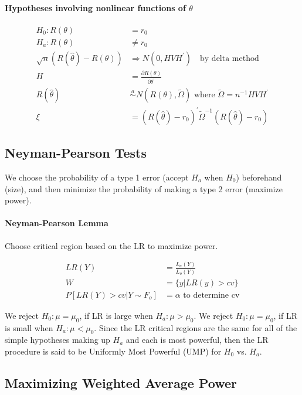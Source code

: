 \paragraph{Hypotheses involving nonlinear functions of $\theta$}

\begin{align*}
    H_0: R(\theta) &= r_0 \\
    H_a: R(\theta) &\neq r_0 \\
    \sqrt{n}(R(\hat{\theta})-R(\theta)) &\Rightarrow N \left(0, H V H^{\prime}\right) \quad \text{by delta method}\\
    H&=\frac{\partial R(\theta)}{\partial \theta^{\prime}} \\
    R(\hat{\theta}) &\stackrel{a}{\sim} N (R(\theta), \tilde{\Omega}) \text{ where } \tilde{\Omega}=n^{-1} H V H^{\prime} \\
    \xi&=\left(R(\hat{\theta})-r_0\right)^{\prime} \tilde{\Omega}^{-1}\left(R(\hat{\theta})-r_0\right)
\end{align*}

\subsection{Neyman-Pearson Tests}

We choose the probability of a type 1 error (accept $H_a$ when $H_0$) beforehand (size), and then minimize the probability of making a type 2 error (maximize power).

\paragraph{Neyman-Pearson Lemma} 
Choose critical region based on the LR to maximize power.

\begin{align*}
    L R(Y)&=\frac{ L _a(Y)}{ L _o(Y)} \\
    W&=\{y | L R(y)> cv \} \\
    P \left[L R(Y)> cv | Y \sim F_o\right]&=\alpha \text{ to determine cv}
\end{align*}

We reject $H_0: \mu=\mu_0$, if LR is large when $H_a: \mu>\mu_0$. We reject $H_0: \mu=\mu_0$, if LR is small when $H_a: \mu<\mu_0$.
Since the LR critical regions are the same for all of the simple hypotheses making up $H_a$ and each is most powerful, then the LR procedure is said to be Uniformly Most Powerful (UMP) for $H_0$ vs. $H_a$.

\subsection{Maximizing Weighted Average Power}

